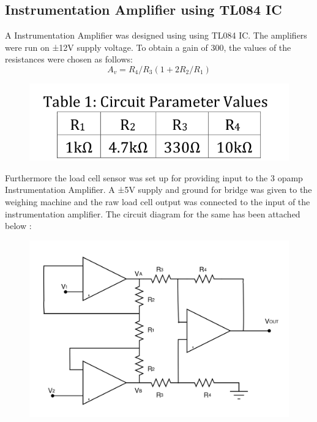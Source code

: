\documentclass[12pt]{article}
\begin{document}
\subsection{Instrumentation Amplifier using TL084 IC}
A Instrumentation Amplifier was designed using using TL084 IC. The
amplifiers were run on ±12V supply voltage. To obtain a gain of 300, the
values of the resistances were chosen as follows:
\begin{equation}
A_{v}=R_{4}/R_{3}(1+2R_{2}/R_{1})
 \end{equation}  
 \begin{figure}
\centering
\includegraphics[scale = 0.3]{table1.png}
\end{figure}
Furthermore the load cell sensor was set up for providing input to the 3
opamp Instrumentation Amplifier. A ±5V supply and ground for bridge was
given to the weighing machine and the raw load cell output was connected
to the input of the instrumentation amplifier. The circuit diagram for the
same has been attached below :
\newpage
\begin{figure}
\centering
\includegraphics[scale = 0.3]{ins_amp_tl084.png}
\end{figure}
\end{document}
